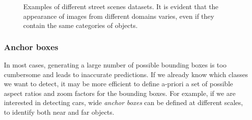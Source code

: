 \documentclass[%
    corpo=12pt,
    twoside,
    stile=classica,   
    tipotesi=magistrale,
    evenboxes,
    english,
	numerazioneromana,
]{toptesi}
\begin{document}
\begin{figure}[ht]
	\centering
	\caption{Examples of different street scenes datasets. It is evident that the appearance of images from different domains varies, even if they contain the same categories of objects.}
	\label{fig:datasets}
\end{figure}

\subsubsection{Anchor boxes}\label{sec:anchor}
In most cases, generating a large number of possible bounding boxes is too cumbersome and leads to inaccurate predictions. If we already know which classes we want to detect, it may be more efficient to define a-priori a set of possible aspect ratios and zoom factors for the bounding boxes. For example, if we are interested in detecting cars, wide \textit{anchor boxes} can be defined at different scales, to identify both near and far objects.
\end{document}

